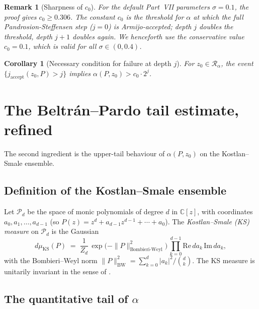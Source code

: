 \documentclass[11pt,a4paper]{article}
\newtheorem{corollary}[theorem]{Corollary}
\newtheorem{remark}[theorem]{Remark}
\begin{document}
\begin{remark}[Sharpness of $c_0$]
For the default Part~VII parameters $\sigma = 0.1$, the proof gives $c_0 \ge 0.306$. The constant $c_0$ is the threshold for $\alpha$ at which the \emph{full} Pandrosion-Steffensen step ($j = 0$) is Armijo-accepted; depth $j$ doubles the threshold, depth $j+1$ doubles again. We henceforth use the conservative value $c_0 = 0.1$, which is valid for all $\sigma \in (0, 0.4)$.
\end{remark}

\begin{corollary}[Necessary condition for failure at depth $j$]\label{cor:depth-fail}
For $z_0 \in \mathcal{R}_\alpha$, the event $\{j_{\text{accept}}(z_0, P) > j\}$ implies $\alpha(P, z_0) > c_0 \cdot 2^{j}$.
\end{corollary}

\section{The Beltr\'an--Pardo tail estimate, refined}\label{sec:bp-tail}

The second ingredient is the upper-tail behaviour of $\alpha(P, z_0)$ on the Kostlan--Smale ensemble.

\subsection{Definition of the Kostlan--Smale ensemble}
Let $\mathcal{P}_d$ be the space of monic polynomials of degree $d$ in $\mathbb{C}[z]$, with coordinates $a_0, a_1, \dots, a_{d-1}$ (so $P(z) = z^d + a_{d-1} z^{d-1} + \cdots + a_0$). The \emph{Kostlan--Smale (KS) measure} on $\mathcal{P}_d$ is the Gaussian
\begin{equation}\label{eq:ks-measure}
d\mu_{\text{KS}}(P) \;=\; \frac{1}{Z_d}\, \exp\!\bigl(-\|P\|_{\text{Bombieri-Weyl}}^{2}\bigr)\, \prod_{k=0}^{d-1} \mathrm{Re}\,da_k\, \mathrm{Im}\,da_k,
\end{equation}
with the Bombieri--Weyl norm $\|P\|_{\text{BW}}^{2} = \sum_{k=0}^{d} |a_k|^2 / \binom{d}{k}$. The KS measure is unitarily invariant in the sense of \cite{shubsmale}.

\subsection{The quantitative tail of $\alpha$}
\end{document}
